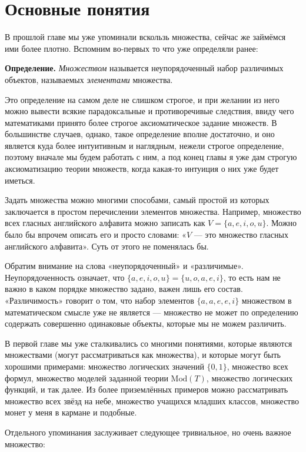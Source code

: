 \section{Основные понятия}

В прошлой главе мы уже упоминали вскользь множества, сейчас же займёмся ими более плотно. Вспомним во-первых то что уже определяли ранее:

{\bfseries Определение.} {\slshape Множеством} называется неупорядоченный набор различимых объектов, называемых {\slshape элементами} множества.

Это определение на самом деле не слишком строгое, и при желании из него можно вывести всякие парадоксальные и противоречивые следствия, ввиду чего математиками принято более строгое аксиоматическое задание множеств. В большинстве случаев, однако, такое определение вполне достаточно, и оно является куда более интуитивным и наглядным, нежели строгое определение, поэтому вначале мы будем работать с ним, а под конец главы я уже дам строгую аксиоматизацию теории множеств, когда какая-то интуиция о них уже будет иметься.

Задать множества можно многими способами, самый простой из которых заключается в простом перечислении элементов множества. Например, множество всех гласных английского алфавита можно записать как $V = \{a, e, i, o, u\}$. Можно было бы впрочем описать его и просто словами: «$V$ — это множество гласных английского алфавита». Суть от этого не поменялась бы.

Обратим внимание на слова «неупорядоченный» и «различимые». Неупорядоченность означает, что $\{a, e, i, o, u\} = \{u, o, a, e, i\}$, то есть нам не важно в каком порядке множество задано, важен лишь его состав. «Различимость» говорит о том, что набор элементов $\{a, a, e, e, i\}$ множеством в математическом смысле уже не является — множество не может по определению содержать совершенно одинаковые объекты, которые мы не можем различить.

В первой главе мы уже сталкивались со многими понятиями, которые являются множествами (могут рассматриваться как множества), и которые могут быть хорошими примерами: множество логических значений $\{0, 1\}$, множество всех формул, множество моделей заданной теории $\mathrm{Mod}(T)$, множество логических функций, и так далее. Из более приземлённых примеров можно рассматривать множество всех звёзд на небе, множество учащихся младших классов, множество монет у меня в кармане и подобные.

Отдельного упоминания заслуживает следующее тривиальное, но очень важное множество:

